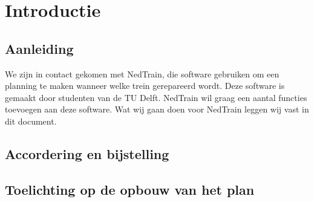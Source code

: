 \section{Introductie}
\subsection{Aanleiding}
We zijn in contact gekomen met NedTrain, die software gebruiken om een planning te maken wanneer welke trein gerepareerd wordt. Deze software is gemaakt door studenten van de TU Delft. NedTrain wil graag een aantal functies toevoegen aan deze software. Wat wij gaan doen voor NedTrain leggen wij vast in dit document. 
\subsection{Accordering en bijstelling}
\subsection{Toelichting op de opbouw van het plan}
